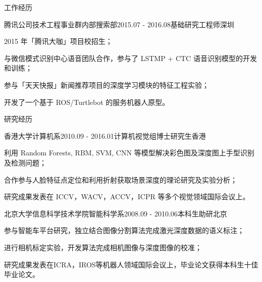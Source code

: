 \documentclass[UTF8]{cv_professional-cn} %
\begin{document}
\begin{rSection}{工作经历}
	\begin{rSubsection}{腾讯公司技术工程事业群内部搜索部}{2015.07 - 2016.08}{基础研究工程师}{深圳}
		\item 2015 年「腾讯大咖」项目校招生；
		\item 与微信模式识别中心语音团队合作，参与了 LSTMP + CTC 语音识别模型的开发和训练；
		\item 参与「天天快报」新闻推荐项目的深度学习模块的特征工程实验；
		\item 开发了一个基于 ROS/Turtlebot 的服务机器人原型。
	\end{rSubsection}

\end{rSection}



\begin{rSection}{研究经历}

\begin{rSubsection}{香港大学计算机系}{2010.09 - 2016.01}{计算机视觉组博士研究生}{香港}
	\item 利用 Random Forests, RBM, SVM, CNN 等模型解决彩色图及深度图上手型识别及检测问题；
	\item 合作参与人脸特征点定位和利用折射获取场景深度的理论研究及实验分析；
	\item 研究成果发表在 ICCV，WACV，ACCV，ICPR 等多个视觉领域国际会议上。
\end{rSubsection}

\begin{rSubsection}{北京大学信息科学技术学院智能科学系}{2008.09 - 2010.06}{本科生助研}{北京}
    \item 参与智能车平台研究，独立结合图像分割算法完成激光深度数据的语义标注；
    \item 进行相机标定实验，开发算法完成相机图像与深度图像的校准；
    \item 研究成果发表在ICRA，IROS等机器人领域国际会议上，毕业论文获得本科生十佳毕业论文。
\end{rSubsection}

\end{rSection}

\end{document}
